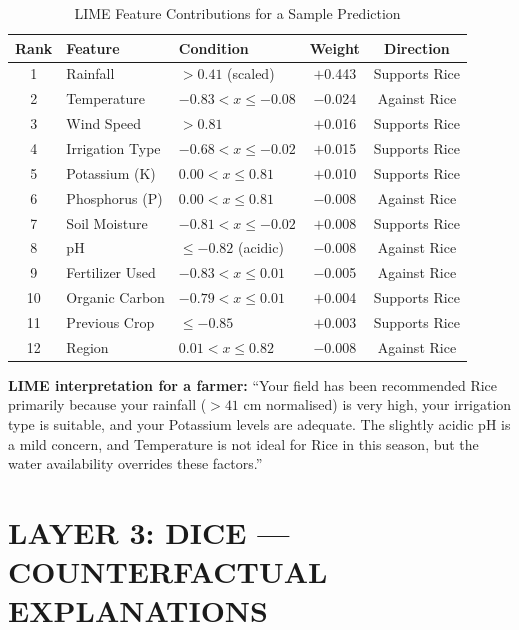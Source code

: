 \documentclass[12pt,a4paper,oneside]{report}
\begin{document}
\begin{table}[H]
\centering
\caption{LIME Feature Contributions for a Sample Prediction}
\label{tab:lime_results}
\renewcommand{\arraystretch}{1.3}
\begin{tabular}{c p{3.2cm} p{4.5cm} c c}
\toprule
\textbf{Rank} & \textbf{Feature} & \textbf{Condition} & \textbf{Weight} & \textbf{Direction} \\
\midrule
1  & Rainfall       & $> 0.41$ (scaled)              & $+$0.443 & Supports Rice \\
2  & Temperature    & $-0.83 < x \leq -0.08$        & $-$0.024 & Against Rice \\
3  & Wind Speed     & $> 0.81$                       & $+$0.016 & Supports Rice \\
4  & Irrigation Type & $-0.68 < x \leq -0.02$       & $+$0.015 & Supports Rice \\
5  & Potassium (K)  & $0.00 < x \leq 0.81$          & $+$0.010 & Supports Rice \\
6  & Phosphorus (P) & $0.00 < x \leq 0.81$          & $-$0.008 & Against Rice  \\
7  & Soil Moisture  & $-0.81 < x \leq -0.02$        & $+$0.008 & Supports Rice \\
8  & pH             & $\leq -0.82$ (acidic)          & $-$0.008 & Against Rice  \\
9  & Fertilizer Used & $-0.83 < x \leq 0.01$        & $-$0.005 & Against Rice  \\
10 & Organic Carbon & $-0.79 < x \leq 0.01$         & $+$0.004 & Supports Rice \\
11 & Previous Crop  & $\leq -0.85$                   & $+$0.003 & Supports Rice \\
12 & Region         & $0.01 < x \leq 0.82$           & $-$0.008 & Against Rice  \\
\bottomrule
\end{tabular}
\end{table}

\textbf{LIME interpretation for a farmer:} ``Your field has been recommended Rice primarily because your rainfall ($>41$ cm normalised) is very high, your irrigation type is suitable, and your Potassium levels are adequate. The slightly acidic pH is a mild concern, and Temperature is not ideal for Rice in this season, but the water availability overrides these factors.''

\section{LAYER 3: DICE --- COUNTERFACTUAL EXPLANATIONS}
\end{document}
